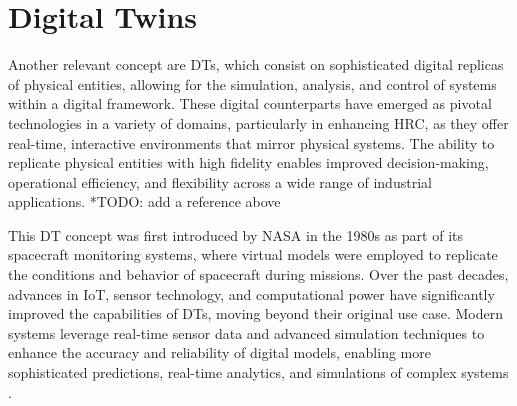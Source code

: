 



\section{Digital Twins}
\label{sec:dt}
Another relevant concept are \ac{DTs}, which consist on sophisticated digital replicas of physical entities, allowing for the simulation, analysis, and control of systems within a digital framework. These digital counterparts have emerged as pivotal technologies in a variety of domains, particularly in enhancing \ac{HRC}, as they offer real-time, interactive environments that mirror physical systems. The ability to replicate physical entities with high fidelity enables improved decision-making, operational efficiency, and flexibility across a wide range of industrial applications.
*TODO: add a reference above

This \ac{DT} concept was first introduced by NASA in the 1980s as part of its spacecraft monitoring systems, where virtual models were employed to replicate the conditions and behavior of spacecraft during missions. Over the past decades, advances in \ac{IoT}, sensor technology, and computational power have significantly improved the capabilities of \ac{DTs}, moving beyond their original use case. Modern systems leverage real-time sensor data and advanced simulation techniques to enhance the accuracy and reliability of digital models, enabling more sophisticated predictions, real-time analytics, and simulations of complex systems \cite{liu2022digitaltwin}.

